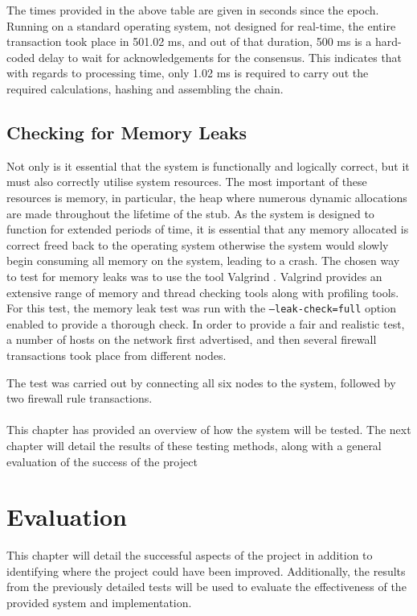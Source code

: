 \documentclass[a4paper, 11pt]{report}
\begin{document}
The times provided in the above table are given in seconds since the epoch. Running on a standard operating system, not designed for real-time, the entire transaction took place in 501.02 ms, and out of that duration, 500 ms is a hard-coded delay to wait for acknowledgements for the consensus. This indicates that with regards to processing time, only 1.02 ms is required to carry out the required calculations, \gls{hashing} and assembling the chain.

\section{Checking for Memory Leaks}
Not only is it essential that the system is functionally and logically correct, but it must also correctly utilise system resources. The most important of these resources is memory, in particular, the heap where numerous dynamic allocations are made throughout the lifetime of the \gls{stub}. As the system is designed to function for extended periods of time, it is essential that any memory allocated is correct freed back to the operating system otherwise the system would slowly begin consuming all memory on the system, leading to a crash.
The chosen way to test for memory leaks was to use the tool Valgrind \cite{valgrind}. Valgrind provides an extensive range of memory and thread checking tools along with profiling tools. For this test, the memory leak test was run with the \texttt{--leak-check=full} option enabled to provide a thorough check. In order to provide a fair and realistic test, a number of hosts on the network first advertised, and then several firewall transactions took place from different nodes. 

The test was carried out by connecting all six nodes to the system, followed by two firewall rule transactions. \\\\

This chapter has provided an overview of how the system will be tested. The next chapter will detail the results of these testing methods, along with a general evaluation of the success of the project

\chapter{Evaluation}

This chapter will detail the successful aspects of the project in addition to identifying where the project could have been improved. Additionally, the results from the previously detailed tests will be used to evaluate the effectiveness of the provided system and implementation.
\end{document}
